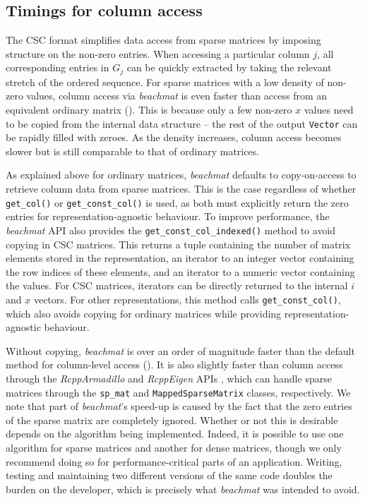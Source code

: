 \documentclass{article}
\newcommand{\beachmat}{\textit{beachmat}}
\newcommand{\code}[1]{\texttt{#1}}
\begin{document}
\subsection{Timings for column access}
The CSC format simplifies data access from sparse matrices by imposing structure on the non-zero entries.
When accessing a particular column $j$, all corresponding entries in $G_j$ can be quickly extracted by taking the relevant stretch of the ordered sequence.
For sparse matrices with a low density of non-zero values, column access via \beachmat{} is even faster than access from an equivalent ordinary matrix (\suppfigsparsecol{}).
This is because only a few non-zero $x$ values need to be copied from the internal data structure -- the rest of the output \code{Vector} can be rapidly filled with zeroes.
As the density increases, column access becomes slower but is still comparable to that of ordinary matrices.

As explained above for ordinary matrices, \beachmat{} defaults to copy-on-access to retrieve column data from sparse matrices.
This is the case regardless of whether \code{get\_col()} or \code{get\_const\_col()} is used, as both must explicitly return the zero entries for representation-agnostic behaviour.
To improve performance, the \beachmat{} API also provides the \code{get\_const\_col\_indexed()} method to avoid copying in CSC matrices.
This returns a tuple containing the number of matrix elements stored in the representation, an iterator to an integer vector containing the row indices of these elements, and an iterator to a numeric vector containing the values.
For CSC matrices, iterators can be directly returned to the internal $i$ and $x$ vectors.
For other representations, this method calls \code{get\_const\_col()}, which also avoids copying for ordinary matrices while providing representation-agnostic behaviour.

Without copying, \beachmat{} is over an order of magnitude faster than the default method for column-level access (\suppfigsparsecol{}).
It is also slightly faster than column access through the \textit{RcppArmadillo} and \textit{RcppEigen} APIs \cite{eddelbuettel2014arma,bates2013fast}, which can handle sparse matrices through the \code{sp\_mat} and \code{MappedSparseMatrix} classes, respectively.
We note that part of \beachmat{}'s speed-up is caused by the fact that the zero entries of the sparse matrix are completely ignored.
Whether or not this is desirable depends on the algorithm being implemented.
Indeed, it is possible to use one algorithm for sparse matrices and another for dense matrices, though we only recommend doing so for performance-critical parts of an application.
Writing, testing and maintaining two different versions of the same code doubles the burden on the developer, which is precisely what \beachmat{} was intended to avoid.
\end{document}
